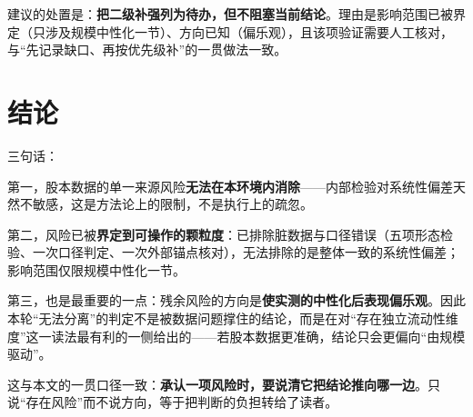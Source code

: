 \documentclass[11pt,a4paper]{ctexart}
\begin{document}
建议的处置是：\textbf{把二级补强列为待办，但不阻塞当前结论}。理由是影响范围已被界定（只涉及规模中性化一节）、方向已知（偏乐观），且该项验证需要人工核对，与“先记录缺口、再按优先级补”的一贯做法一致。

\section{结论}

三句话：

第一，股本数据的单一来源风险\textbf{无法在本环境内消除}——内部检验对系统性偏差天然不敏感，这是方法论上的限制，不是执行上的疏忽。

第二，风险已被\textbf{界定到可操作的颗粒度}：已排除脏数据与口径错误（五项形态检验、一次口径判定、一次外部锚点核对），无法排除的是整体一致的系统性偏差；影响范围仅限规模中性化一节。

第三，也是最重要的一点：残余风险的方向是\textbf{使实测的中性化后表现偏乐观}。因此本轮“无法分离”的判定不是被数据问题撑住的结论，而是在对“存在独立流动性维度”这一读法最有利的一侧给出的——若股本数据更准确，结论只会更偏向“由规模驱动”。

\medskip

\noindent 这与本文的一贯口径一致：\textbf{承认一项风险时，要说清它把结论推向哪一边}。只说“存在风险”而不说方向，等于把判断的负担转给了读者。
\end{document}
